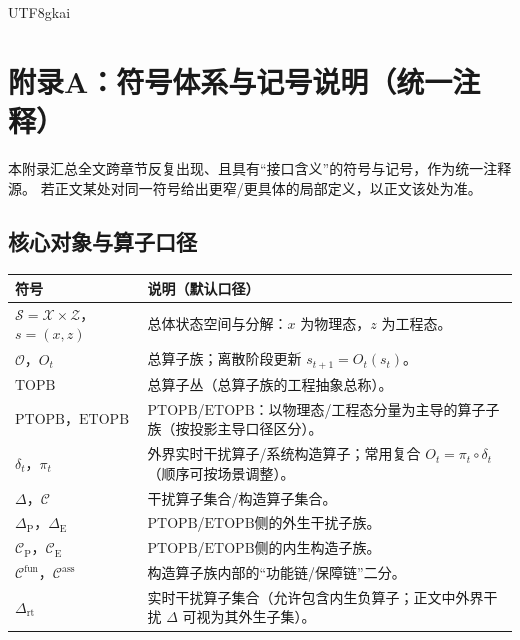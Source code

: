 \documentclass[12pt]{article}
\newcommand{\PTOPB}{\ensuremath{\mathrm{PTOPB}}}
\newcommand{\ETOPB}{\ensuremath{\mathrm{ETOPB}}}
\newcommand{\TOPB}{\ensuremath{\mathrm{TOPB}}}
\newcommand{\DeltaRT}{\ensuremath{\Delta_{\mathrm{rt}}}}
\begin{document}
\begin{CJK*}{UTF8}{gkai}
\appendix

\section{附录A：符号体系与记号说明（统一注释）}
本附录汇总全文跨章节反复出现、且具有“接口含义”的符号与记号，作为统一注释源。
若正文某处对同一符号给出更窄/更具体的局部定义，以正文该处为准。

\subsection{核心对象与算子口径}
\begin{longtable}{>{\raggedright\arraybackslash}p{} >{\raggedright\arraybackslash}p{}}
\hline
\textbf{符号} & \textbf{说明（默认口径）} \\\hline
$\mathcal{S}=\mathcal{X}\times \mathcal{Z}$，$s=(x,z)$
& 总体状态空间与分解：$x$ 为物理态，$z$ 为工程态。\\
$\mathcal{O}$，$O_t$
& 总算子族；离散阶段更新 $s_{t+1}=O_t(s_t)$。\\
$\TOPB$
& 总算子丛（总算子族的工程抽象总称）。\\
$\PTOPB$，$\ETOPB$
& \PTOPB/\ETOPB：以物理态/工程态分量为主导的算子子族（按投影主导口径区分）。\\
$\delta_t$，$\pi_t$
& 外界实时干扰算子/系统构造算子；常用复合 $O_t=\pi_t\circ\delta_t$（顺序可按场景调整）。\\
$\Delta$，$\mathcal{C}$
& 干扰算子集合/构造算子集合。\\
$\Delta_{\mathrm{P}}$，$\Delta_{\mathrm{E}}$
& \PTOPB/\ETOPB 侧的外生干扰子族。\\
$\mathcal{C}_{\mathrm{P}}$，$\mathcal{C}_{\mathrm{E}}$
& \PTOPB/\ETOPB 侧的内生构造子族。\\
$\mathcal{C}^{\mathrm{fun}}$，$\mathcal{C}^{\mathrm{ass}}$
& 构造算子族内部的“功能链/保障链”二分。\\
$\DeltaRT$
& 实时干扰算子集合（允许包含内生负算子；正文中外界干扰 $\Delta$ 可视为其外生子集）。\\
\hline
\end{longtable}


\end{CJK*}
\end{document}
